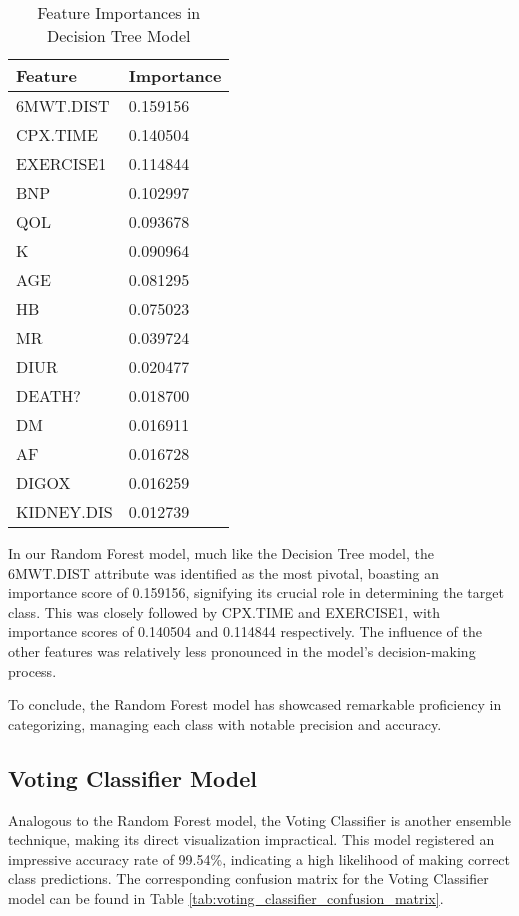     \begin{table}[H]
      \centering
      \caption{Feature Importances in Decision Tree Model}
      \label{tab:decision_tree_feature_importance}
      \begin{tabular}{|p{3cm}|p{2.5cm}|}
      \hline
      \textbf{Feature} & \textbf{Importance} \\ \hline
      6MWT.DIST &    0.159156 \\
      CPX.TIME  &    0.140504 \\
      EXERCISE1 &    0.114844 \\
      BNP       &    0.102997 \\
      QOL       &    0.093678 \\
      K         &    0.090964 \\
      AGE       &    0.081295 \\
      HB        &    0.075023 \\
      MR        &    0.039724 \\
      DIUR      &    0.020477 \\
      DEATH?    &    0.018700 \\
      DM        &    0.016911 \\
      AF        &    0.016728 \\
      DIGOX     &    0.016259 \\
      KIDNEY.DIS &   0.012739 \\ \hline
      \end{tabular}
    \end{table}

    In our Random Forest model, much like the Decision Tree model, the 6MWT.DIST attribute was identified as the most pivotal, boasting an importance score of 0.159156, signifying its crucial role in determining the target class. This was closely followed by CPX.TIME and EXERCISE1, with importance scores of 0.140504 and 0.114844 respectively. The influence of the other features was relatively less pronounced in the model's decision-making process.

    To conclude, the Random Forest model has showcased remarkable proficiency in categorizing, managing each class with notable precision and accuracy.

\subsection{Voting Classifier Model}
\label{subsec:voting_classifier_model}

Analogous to the Random Forest model, the Voting Classifier is another ensemble technique, making its direct visualization impractical. This model registered an impressive accuracy rate of 99.54\%, indicating a high likelihood of making correct class predictions. The corresponding confusion matrix for the Voting Classifier model can be found in Table \ref{tab:voting_classifier_confusion_matrix}.


